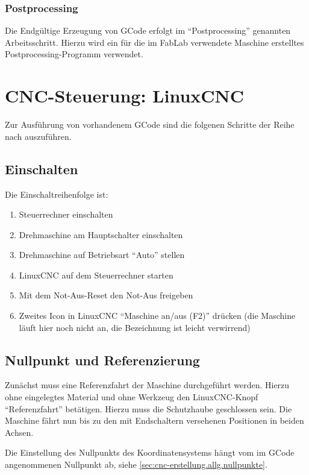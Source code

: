 \documentclass{\basedir/fablab-document}
\begin{document}
\subsubsection{Postprocessing}

Die Endgültige Erzeugung von GCode erfolgt im "`Postprocessing"' genannten Arbeitsschritt. Hierzu wird ein für die im FabLab verwendete Maschine erstelltes Postprocessing-Programm verwendet. 

\section{CNC-Steuerung: LinuxCNC}

Zur Ausführung von vorhandenem GCode sind die folgenen Schritte der Reihe nach auszuführen.

\subsection{Einschalten}
Die Einschaltreihenfolge ist:
\begin{enumerate}
	\item Steuerrechner einschalten
	\item Drehmaschine am Hauptschalter einschalten
	\item Drehmaschine auf Betriebsart \enquote{Auto} stellen
	\item LinuxCNC auf dem Steuerrechner starten
	\item Mit dem Not-Aus-Reset den Not-Aus freigeben
	\item Zweites Icon in LinuxCNC "`Maschine an/aus (F2)"' drücken (die Maschine läuft hier noch nicht an, die Bezeichnung ist leicht verwirrend)
\end{enumerate}

\subsection{Nullpunkt und Referenzierung}

Zunächst muss eine Referenzfahrt der Maschine durchgeführt werden. Hierzu ohne eingelegtes Material und ohne Werkzeug den LinuxCNC-Knopf \enquote{Referenzfahrt} betätigen. Hierzu muss die Schutzhaube geschlossen sein. Die Maschine fährt nun bis zu den mit Endschaltern versehenen Positionen in beiden Achsen.

Die Einstellung des Nullpunkts des Koordinatensystems hängt vom im GCode angenommenen Nullpunkt ab, siehe \ref{sec:cnc-erstellung.allg.nullpunkte}.
\end{document}
